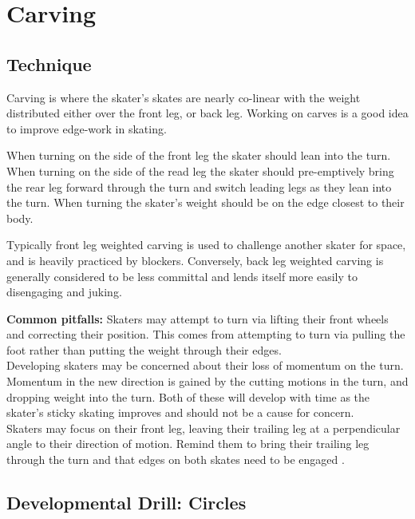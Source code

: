 \section{Carving}
\label{sec:sticky/carves}

\subsection*{Technique}

Carving is where the skater's skates are nearly co-linear with the weight distributed either over the front leg, or back leg.
Working on carves is a good idea to improve edge-work in skating.  


When turning on the side of the front leg the skater should lean into the turn.  
When turning on the side of the read leg the skater should pre-emptively bring the rear leg forward through the turn and switch leading legs as they lean into the turn.  
When turning the skater's weight should be on the edge closest to their body.   


Typically front leg weighted carving is used to challenge another skater for space, and is heavily practiced by blockers.     
Conversely, back leg weighted carving is generally considered to be less committal and lends itself more easily to disengaging and juking.


{\bf Common pitfalls:}
Skaters may attempt to turn via lifting their front wheels and correcting their position.
This comes from attempting to turn via pulling the foot rather than putting the weight through their edges. \\ 



Developing skaters may be concerned about their loss of momentum on the turn. 
Momentum in the new direction is gained by the cutting motions in the turn, and dropping weight into the turn.   
Both of these will develop with time as the skater's sticky skating improves and should not be a cause for concern. \\ 



Skaters may focus on their front leg, leaving their trailing leg at a perpendicular angle to their direction of motion.   
Remind them to bring their trailing leg through the turn and that edges on both skates need to be engaged .

 
\subsection*{Developmental Drill: Circles}

